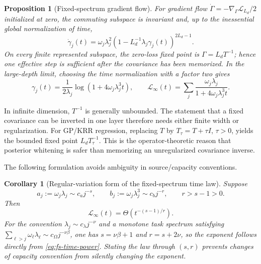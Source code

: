 \documentclass[11pt,a4paper]{article}
\numberwithin{equation}{section}
\newtheorem{proposition}[theorem]{Proposition}
\newtheorem{corollary}[theorem]{Corollary}
\theoremstyle{definition}
\theoremstyle{remark}
\newcommand{\loss}{\mathcal L}
\begin{document}
\begin{proposition}[Fixed-spectrum gradient flow]
\label{prop:fs-flow}
For gradient flow $\dot\Gamma=-\nabla_\Gamma\loss_{L_d}/2$ initialized at
zero, the commuting subspace is invariant and, up to the inessential global
normalization of time,
\begin{equation}
 \dot\gamma_j(t)
 =\omega_j\lambda_j^2
 \left(1-L_d^{-1}\lambda_j\gamma_j(t)\right)^{2L_d-1}.
 \label{eq:fs-modal-flow}
\end{equation}
On every finite represented subspace, the zero-loss fixed point is
$\Gamma=L_dT^{-1}$; hence one effective step is sufficient after the
covariance has been memorized.  In the large-depth limit, choosing the time
normalization with a factor two gives
\begin{equation}
 \gamma_j(t)=\frac{1}{2\lambda_j}
 \log(1+4\omega_j\lambda_j^3t),
 \qquad
 \loss_\infty(t)
 =\sum_j\frac{\omega_j\lambda_j}
 {1+4\omega_j\lambda_j^3t}.
 \label{eq:fs-exact-flow}
\end{equation}
\end{proposition}

In infinite dimension, $T^{-1}$ is generally unbounded.  The statement that a
fixed covariance can be inverted in one layer therefore needs either finite
width or regularization.  For GP/KRR regression, replacing $T$ by
$T_\tau=T+\tau I$, $\tau>0$, yields the bounded fixed point
$L_dT_\tau^{-1}$.  This is the operator-theoretic reason that posterior
whitening is safer than memorizing an unregularized covariance inverse.

The following formulation avoids ambiguity in source/capacity conventions.

\begin{corollary}[Regular-variation form of the fixed-spectrum time law]
\label{cor:fs-regular-variation}
Suppose
\begin{equation}
 a_j:=\omega_j\lambda_j\sim c_a j^{-s},
 \qquad
 b_j:=\omega_j\lambda_j^3\sim c_bj^{-r},
 \qquad r>s-1>0.
 \label{eq:fs-regular-variation}
\end{equation}
Then
\begin{equation}
 \loss_\infty(t)
 =\Theta\!\left(t^{-(s-1)/r}\right).
 \label{eq:fs-time-power}
\end{equation}
For the convention
$\lambda_j\sim c_\lambda j^{-\nu}$ and a monotone task spectrum satisfying
$\sum_{\ell>j}\omega_\ell\lambda_\ell\sim c_\Omega j^{-\nu\beta}$,
one has $s=\nu\beta+1$ and $r=s+2\nu$, so the exponent follows directly from
\eqref{eq:fs-time-power}.  Stating the law through $(s,r)$ prevents changes of
capacity convention from silently changing the exponent.
\end{corollary}
\end{document}
